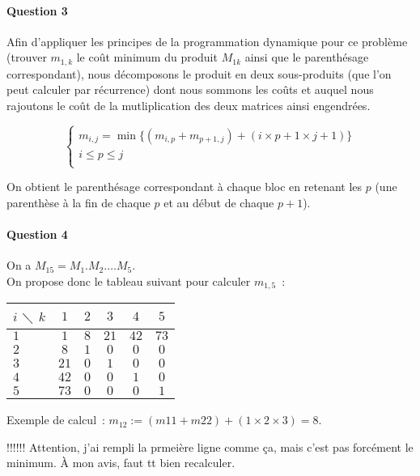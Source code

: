 \paragraph{Question 3}

Afin d'appliquer les principes de la programmation dynamique pour ce
problème (trouver $m_{1,k}$ le coût minimum du produit $M_{1k}$ ainsi
que le parenthésage correspondant), nous décomposons le produit en
deux sous-produits (que l'on peut calculer par récurrence) dont nous
sommons les coûts et auquel nous rajoutons le coût de la
mutliplication des deux matrices ainsi engendrées.

\begin{equation}
\begin{cases}
m_{i,j} = \min \{(m_{i,p}+m_{p+1,j}) + (i \times p+1 \times j+1) \} \\
i \leq p \leq j \\
\end{cases}
\end{equation}

On obtient le parenthésage correspondant à chaque bloc en retenant les
$p$ (une parenthèse à la fin de chaque $p$ et au début de chaque $p+1$).

\paragraph{Question 4}

On a $M_{15} = M_1.M_2.\dots M_5$. \\

On propose donc le tableau suivant pour calculer $m_{1,5}$~:
\begin{center}
\begin{tabular}{|l|c|c|c|c|c|}
\hline  $i$ $\diagdown$ $k$ & $1$  & $2$ & $3$ & $4$ & $5$ \\
\hline $1$ & $1$ & $8$ & $21$ & $42$ & $73$ \\
\hline $2$ & $8$ & $1$ & $0$ & $0$ & $0$ \\
\hline $3$ & $21$ & $0$ & $1$ & $0$ & $0$ \\
\hline $4$ & $42$ & $0$ & $0$ & $1$ & $0$ \\
\hline $5$ & $73$ & $0$ & $0$ & $0$ & $1$ \\
\hline
\end{tabular}
\end{center}

Exemple de calcul~: $m_{12} := (m{11} + m{22}) + (1 \times 2 \times 3)
= 8$.


!!!!!! Attention, j'ai rempli la prmeière ligne comme ça, mais c'est
       pas forcément le minimum. À mon avis, faut tt bien recalculer.

